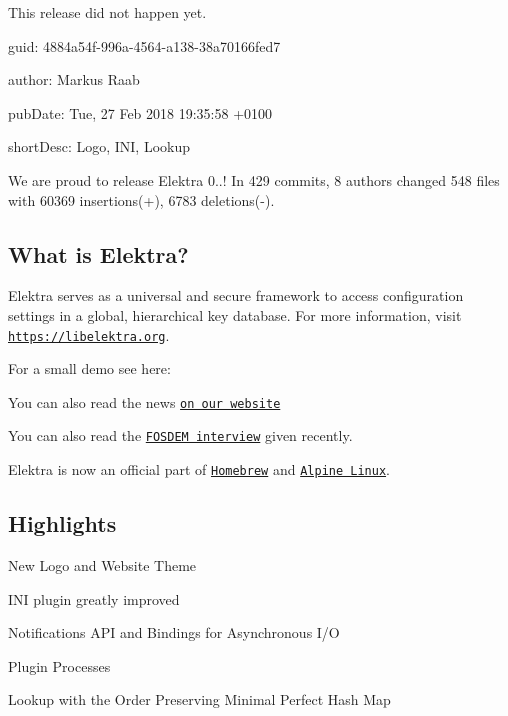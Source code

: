 This release did not happen yet.


\begin{DoxyItemize}
\item guid\+: 4884a54f-\/996a-\/4564-\/a138-\/38a70166fed7
\item author\+: Markus Raab
\item pub\+Date\+: Tue, 27 Feb 2018 19\+:35\+:58 +0100
\item short\+Desc\+: Logo, I\+NI, Lookup
\end{DoxyItemize}

We are proud to release Elektra 0..! In 429 commits, 8 authors changed 548 files with 60369 insertions(+), 6783 deletions(-\/).

\subsection*{What is Elektra?}

Elektra serves as a universal and secure framework to access configuration settings in a global, hierarchical key database. For more information, visit \href{https://libelektra.org}{\tt https\+://libelektra.\+org}.

For a small demo see here\+:

\href{https://asciinema.org/a/cantr04assr4jkv8v34uz9b8r}{\tt }

You can also read the news \href{https://www.libelektra.org/news/0.8.22-release}{\tt on our website}

You can also read the \href{https://fosdem.org/2018/interviews/markus-raab/}{\tt F\+O\+S\+D\+EM interview} given recently.

Elektra is now an official part of \href{http://formulae.brew.sh/formula/elektra}{\tt Homebrew} and \href{https://pkgs.alpinelinux.org/package/edge/testing/x86_64/elektra}{\tt Alpine Linux}.

\subsection*{Highlights}


\begin{DoxyItemize}
\item New Logo and Website Theme
\item I\+NI plugin greatly improved
\item Notifications A\+PI and Bindings for Asynchronous I/O
\item Plugin Processes
\item Lookup with the Order Preserving Minimal Perfect Hash Map
\end{DoxyItemize}

